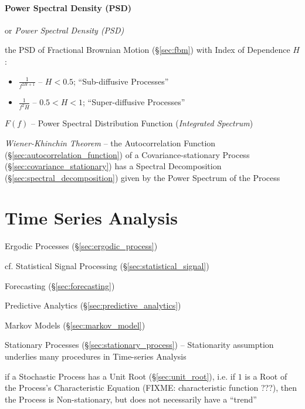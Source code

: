 \paragraph{Power Spectral Density (PSD)}\label{sec:psd}\hfill

or \emph{Power Spectral Density (PSD)}

the PSD of Fractional Brownian Motion (\S\ref{sec:fbm}) with Index of Dependence
$H$:
\begin{itemize}
  \item $\frac{1}{f^{2H+1}}$ -- $H < 0.5$; ``Sub-diffusive Processes''
  \item $\frac{1}{f^2H}$ -- $0.5 < H < 1$; ``Super-diffusive Processes''
\end{itemize}

$F(f)$ -- Power Spectral Distribution Function (\emph{Integrated Spectrum})

\emph{Wiener-Khinchin Theorem} -- the Autocorrelation Function
(\S\ref{sec:autocorrelation_function}) of a Covariance-stationary Process
(\S\ref{sec:covariance_stationary}) has a Spectral Decomposition
(\S\ref{sec:spectral_decomposition}) given by the Power Spectrum of the Process



\section{Time Series Analysis}\label{sec:time_series_analysis}


Ergodic Processes (\S\ref{sec:ergodic_process})

\fist cf. Statistical Signal Processing (\S\ref{sec:statistical_signal})

Forecasting (\S\ref{sec:forecasting})

Predictive Analytics (\S\ref{sec:predictive_analytics})

\fist Markov Models (\S\ref{sec:markov_model})

Stationary Processes (\S\ref{sec:stationary_process}) -- Stationarity assumption
underlies many procedures in Time-series Analysis

if a Stochastic Process has a Unit Root (\S\ref{sec:unit_root}), i.e. if $1$ is
a Root of the Process's Characteristic Equation (FIXME: characteristic function
???), then the Process is Non-stationary, but does not necessarily have a
``trend''

